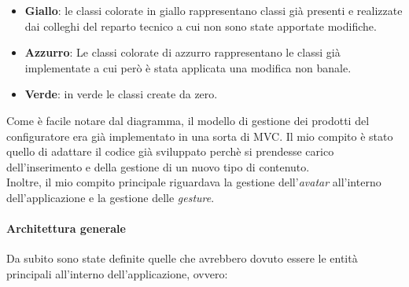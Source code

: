 \begin{itemize}
	\item \textbf{Giallo}: le classi colorate in giallo rappresentano classi gi\`a presenti e realizzate dai colleghi del reparto tecnico a cui non sono state apportate modifiche.
	\item \textbf{Azzurro}: Le classi colorate di azzurro rappresentano le classi gi\`a implementate a cui per\`o \`e stata applicata una modifica non banale.
	\item \textbf{Verde}: in verde le classi create da zero.
\end{itemize}
\noindent
Come \`e facile notare dal diagramma, il modello di gestione dei prodotti del configuratore era gi\`a implementato in una sorta di MVC. Il mio compito \`e stato quello di adattare il codice gi\`a sviluppato perch\`e si prendesse carico dell'inserimento e della gestione di un nuovo tipo di contenuto. \\
Inoltre, il mio compito principale riguardava la gestione dell'\textit{avatar\gloss} all'interno dell'applicazione e la gestione delle \textit{gesture}.

\paragraph{Architettura generale}
Da subito sono state definite quelle che avrebbero dovuto essere le entit\`a principali all'interno dell'applicazione, ovvero:

